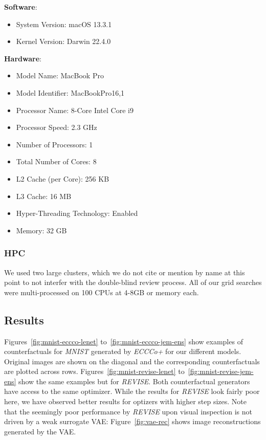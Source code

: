 \textbf{Software}:

\begin{itemize}
  \item System Version: macOS 13.3.1
  \item Kernel Version: Darwin 22.4.0
\end{itemize}

\textbf{Hardware}:

\begin{itemize}
  \item Model Name: MacBook Pro
  \item Model Identifier: MacBookPro16,1
  \item Processor Name: 8-Core Intel Core i9
  \item Processor Speed: 2.3 GHz
  \item Number of Processors: 1
  \item Total Number of Cores: 8
  \item L2 Cache (per Core): 256 KB
  \item L3 Cache: 16 MB
  \item Hyper-Threading Technology: Enabled
  \item Memory: 32 GB
\end{itemize}

\subsubsection{HPC}

We used two large clusters, which we do not cite or mention by name at this point to not interfer with the double-blind review process. All of our grid searches were multi-processed on 100 CPUs at 4-8GB or memory each. 

\subsection{Results}\label{app:results}

Figures~\ref{fig:mnist-eccco-lenet} to~\ref{fig:mnist-eccco-jem-ens} show examples of counterfactuals for \textit{MNIST} generated by \textit{ECCCo+} for our different models. Original images are shown on the diagonal and the corresponding counterfactuals are plotted across rows. Figures~\ref{fig:mnist-revise-lenet} to~\ref{fig:mnist-revise-jem-ens} show the same examples but for \textit{REVISE}. Both counterfactual generators have access to the same optimizer. While the results for \textit{REVISE} look fairly poor here, we have observed better results for optizers with higher step sizes. Note that the seemingly poor performance by \textit{REVISE} upon visual inspection is not driven by a weak surrogate VAE: Figure~\ref{fig:vae-rec} shows image reconstructions generated by the VAE.


